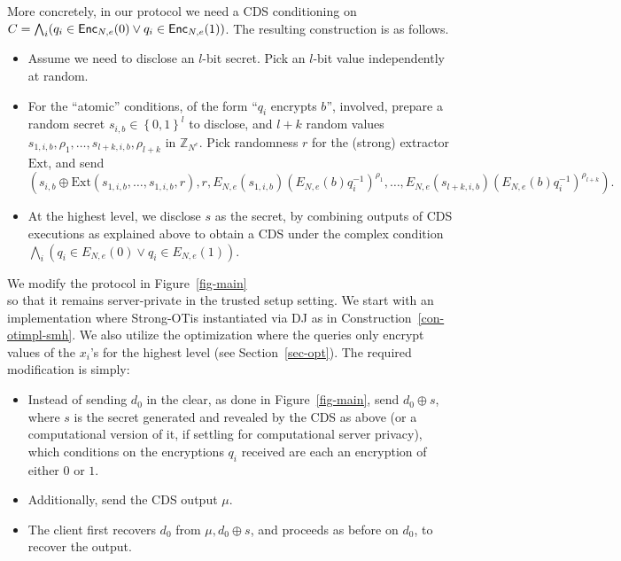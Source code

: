 \documentclass[11pt]{article}
\newcommand{\set}[1]{\left\{#1\right\}}
\newcommand{\Z}{{\mathbb{Z}}}
\newcommand{\enc}{{\sf Enc}}
\newcommand{\strongot}{{Strong-OT\;}}
\begin{document}
More concretely, in our protocol we need a CDS conditioning on $C=\bigwedge_i(q_i\in \enc_{N,e}(0)\vee q_i\in \enc_{N,e}(1))$. The resulting construction is as follows.
\begin{itemize}
\item Assume we need to disclose an $l$-bit secret. Pick an $l$-bit value independently at random.
\item For the ``atomic'' conditions, of the form ``$q_i$ encrypts $b$'', involved, prepare a random secret
$s_{i,b}\in\set{0,1}^l$ to disclose, and $l+k$ random values $s_{1,i,b},\rho_1,\ldots,s_{l+k,i,b},\rho_{l+k}$ in $\Z_{N^e}$. Pick
randomness $r$ for the (strong) extractor $\text{Ext}$, and send \[(s_{i,b}\oplus \text{Ext}(s_{1,i,b},\ldots,s_{1,i,b},r),r,E_{N,e}(s_{1,i,b})(E_{N,e}(b)q^{-1}_i)^{\rho_1},\ldots,E_{N,e}(s_{l+k,i,b})(E_{N,e}(b)q^{-1}_i)^{\rho_{l+k}}).\]
\item At the highest level, we disclose $s$ as the secret, by combining outputs of CDS executions as explained above
to obtain a CDS under the complex condition $\bigwedge_i(q_i\in E_{N,e}(0)\vee q_i\in E_{N,e}(1))$.
\end{itemize}
We modify the protocol in Figure~\ref{fig-main}\\ 
so that it remains server-private in the trusted setup setting. We start with an implementation
where \strongot is instantiated via DJ as in Construction~\ref{con-otimpl-smh}. We also utilize the optimization where the queries only encrypt values of the $x_i$'s for the highest level (see
Section~\ref{sec-opt}). The required modification is simply:
\begin{itemize}
\item Instead of sending $d_0$ in the clear, as done in Figure~\ref{fig-main}, send $d_0\oplus s$, where $s$ is the secret generated and revealed by the CDS as
above (or a computational version of it, if settling for computational server privacy), which conditions on the encryptions $q_i$ received are each an encryption of either $0$ or $1$.
\item Additionally, send the CDS output $\mu$.
\item The client first recovers $d_0$ from $\mu,d_0\oplus s$, and proceeds as before on $d_0$, to recover the output.
\end{itemize}
\end{document}

